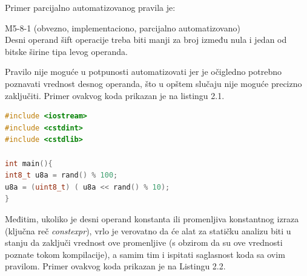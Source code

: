 \documentclass[12pt,oneside]{memoir}
\begin{document}
\begin{itemize}
{Primer parcijalno automatizovanog pravila je: 

\begin{center}

\begin{tcolorbox}
 M5-8-1 (obvezno, implementaciono, parcijalno automatizovano) \\
Desni operand šift operacije treba biti manji za broj između nula i jedan
od bitske širine tipa levog operanda.

\end{tcolorbox}
\end{center}

  Pravilo nije moguće u potpunosti automatizovati jer je očigledno potrebno poznavati vrednost desnog operanda, što u opštem slučaju nije
  moguće precizno zaključiti. Primer ovakvog koda prikazan je na listingu 2.1. \\



\begin{lstlisting}[caption={K\^{o}d koji ilustruje nemogućnost primene statičke analize},label={lst:label1},language=C++, captionpos=b]
#include <iostream>
#include <cstdint>
#include <cstdlib>

int main(){
int8_t u8a = rand() % 100;
u8a = (uint8_t) ( u8a << rand() % 10);
}
\end{lstlisting}
Međitim, ukoliko je desni operand konstanta ili promenljiva konstantnog izraza (klju\v{c}na re\v{c} \textit{constexpr}), vrlo je verovatno da će alat za statičku analizu biti u stanju
  da zaključi vrednost ove promenljive (s obzirom da su ove vrednosti poznate tokom kompilacije), a samim tim i ispitati saglasnost koda sa ovim pravilom.
  Primer ovakvog koda prikazan je na Listingu 2.2. \\



}
\end{itemize}
\end{document}
